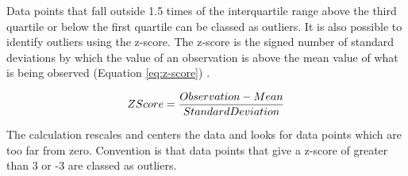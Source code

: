 Data points that fall outside 1.5 times of the interquartile range above the third quartile or below the first quartile can be classed as outliers. It is also possible to identify outliers using the z-score. The z-score is the signed number of standard deviations by which the value of an observation is above the mean value of what is being observed (Equation \ref{eq:z-score}) \cite{engineering-stats-handbook}. 

\begin{equation}
    \label{eq:z-score}
    Z\-Score = \frac{Observation - Mean}{Standard Deviation}
\end{equation}

The calculation rescales and centers the data and looks for data points which are too far from zero. Convention is that data points that give a z-score of greater than 3 or -3 are classed as outliers. 

\clearpage
